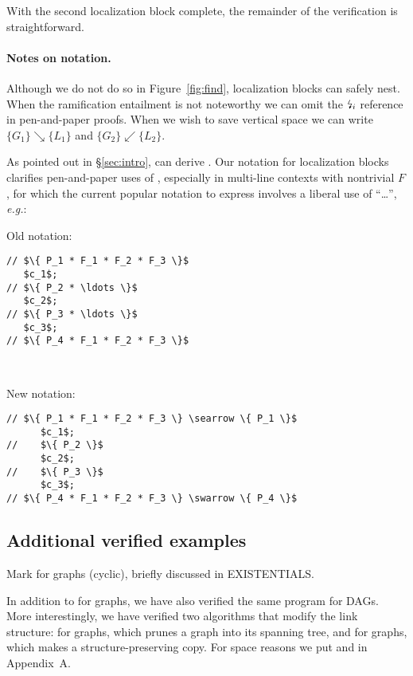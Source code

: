 With the second localization block complete, the remainder of the verification is straightforward.

\paragraph{Notes on notation.} 

Although we do not do so in Figure~\ref{fig:find}, localization blocks can safely nest.  When the ramification entailment is not noteworthy we can omit the $\mbox{\lightning}_i$ reference in pen-and-paper proofs.  When we wish to save vertical space we can write $\{ G_1 \} \searrow \{ L_1 \}$ and $\{ G_2 \} \swarrow \{ L_2 \}$.

As pointed out in \S\ref{sec:intro},  can derive .  Our notation for localization blocks clarifies pen-and-paper uses of , especially in multi-line contexts with nontrivial $F$, for which the current popular notation to express  involves a liberal use of ``\ldots'', \emph{e.g.}:

\vspace{5pt}

\begin{minipage}{.19\textwidth}
Old notation:
\begin{lstlisting}
// $\{ P_1 * F_1 * F_2 * F_3 \}$
   $c_1$;
// $\{ P_2 * \ldots \}$
   $c_2$;
// $\{ P_3 * \ldots \}$
   $c_3$;
// $\{ P_4 * F_1 * F_2 * F_3 \}$
\end{lstlisting}
\end{minipage} \vline ~~~
\begin{minipage}{.2\textwidth}
New notation:
\begin{lstlisting}[numbers=none]
// $\{ P_1 * F_1 * F_2 * F_3 \} \searrow \{ P_1 \}$
      $c_1$;
//    $\{ P_2 \}$
      $c_2$;
//    $\{ P_3 \}$
      $c_3$;
// $\{ P_4 * F_1 * F_2 * F_3 \} \swarrow \{ P_4 \}$
\end{lstlisting}
\end{minipage}
\vspace{-0.75ex}

\subsection{Additional verified examples}
\label{sec:application}

Mark for graphs (cyclic), briefly discussed in EXISTENTIALS.

In addition to  for graphs, we have also verified the same program for DAGs.
More interestingly, we have verified two algorithms that modify the link structure:
 for graphs, which prunes a graph into its spanning tree, and 
for graphs, which makes a structure-preserving copy.  For space reasons we put
 and  in Appendix~A\hide{\ref{apx:spanning}}.


